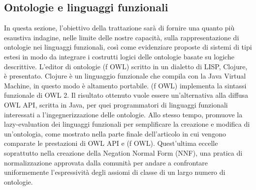 \subsection{Ontologie e linguaggi funzionali}
In questa sezione, l'obiettivo della trattazione sarà di fornire una quanto più esaustiva indagine, nelle limite delle nostre capacità, sulla rappresentazione di ontologie nei linguaggi funzionali, così come evidenziare proposte di sistemi di tipi estesi in modo da integrare i costrutti logici delle ontologie basate su logiche descrittive.
L'editor di ontologie (f OWL) \cite{fOWL} scritto in un dialetto di LISP, Clojure, è presentato. Clojure è un linguaggio funzionale che compila con la Java Virtual Machine, in questo modo è altamento portabile. (f OWL) implementa la sintassi funzionale di OWL 2. Il risultato ottenuto vuole essere un'alternativa alla diffusa OWL API, scritta in Java, per quei programmatori di linguaggi funzionali interessati a l'ingegnerizzazione delle ontologie. Allo stesso tempo, promuove la lazy-evaluation dei linguaggi funzionali per semplificare la creazione e modifica di un'ontologia, come mostrato nella parte finale dell'articolo in cui vengono comparate le prestazioni di OWL API e (f OWL). Quest'ultima eccelle soprattutto nella creazione della Negation Normal Form (NNF), una pratica di normalizzazione approvata dalla comunità per andare a confrontare uniformemente l'espressività degli assiomi di classe di un largo numero di ontologie.

